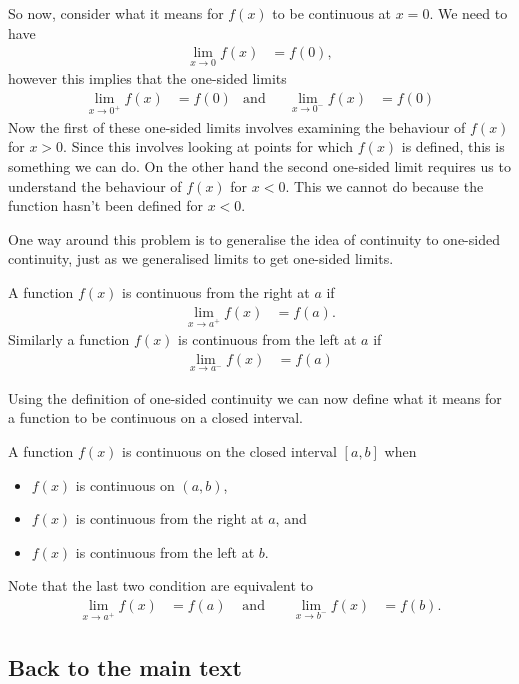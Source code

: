 So now, consider what it means for $f(x)$ to be continuous at $x=0$. We need to have
\begin{align*}
  \lim_{x\to 0} f(x) &= f(0),
\end{align*}
however this implies that the one-sided limits
\begin{align*}
  \lim_{x\to 0^+} f(x) &= f(0) & \text{and}&& \lim_{x\to 0^-} f(x) &= f(0)
\end{align*}
Now the first of these one-sided limits involves examining the behaviour of $f(x)$ for
$x>0$. Since this involves looking at points for which $f(x)$ is defined, this is
something we can do. On the other hand the second one-sided limit requires us to
understand the behaviour of $f(x)$ for $x<0$. This we cannot do because the function
hasn't been defined for $x<0$.

One way around this problem is to generalise the idea of continuity to one-sided
continuity, just as we generalised limits to get one-sided limits.
\begin{defn}
  A function $f(x)$ is continuous from the right at $a$ if
  \begin{align*}
    \lim_{x\to a^+} f(x) &= f(a).
  \end{align*}
  Similarly a function $f(x)$ is continuous from the left at $a$ if
  \begin{align*}
    \lim_{x\to a^-} f(x) &= f(a)
  \end{align*}
\end{defn}

Using the definition of one-sided continuity we can now define what it means for a
function to be continuous on a closed interval.
\begin{defn}
 A function $f(x)$ is continuous on the closed interval $[a,b]$ when
\begin{itemize}
 \item $f(x)$ is continuous on $(a,b)$,
 \item $f(x)$ is continuous from the right at $a$, and
 \item $f(x)$ is continuous from the left at $b$.
\end{itemize}
Note that the last two condition are equivalent to
\begin{align*}
   \lim_{x\to a^+} f(x) &= f(a) & \text{ and }&&
  \lim_{x\to b^-} f(x) &= f(b).
\end{align*}
\end{defn}

\subsection*{Back to the main text}


